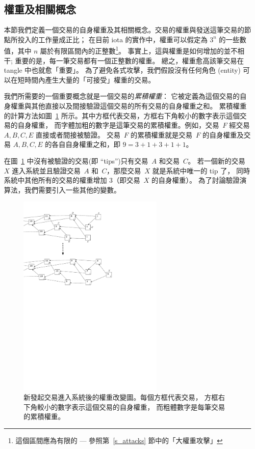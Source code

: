 \documentclass[12pt]{article}
\begin{document}
\begin{CJK}{UTF8}{bkai}
\section{權重及相關概念}
\label{s_weight_algo}
本節我們定義一個交易的自身權重及其相關概念。交易的權重與發送這筆交易的節點所投入的工作量成正比；
在目前 iota 的實作中，權重可以假定為 $3^n$ 的一些數值，其中 $n$ 屬於有限區間內的正整數\footnote{這個區間應為有限的 --- 
參照第~\ref{s_attacks} 節中的「大權重攻擊」}。
事實上，這與權重是如何增加的並不相干; 重要的是，每一筆交易都有一個正整數的權重。
總之，權重愈高該筆交易在 tangle 中也就愈「重要」。
為了避免各式攻擊，我們假設沒有任何角色 (entity) 可以在短時間內產生大量的「可接受」權重的交易。
 
我們所需要的一個重要概念就是一個交易的\emph{累積權重}：
它被定義為這個交易的自身權重與其他直接以及間接驗證這個交易的所有交易的自身權重之和。
累積權重的計算方法如圖~\ref{f_weights} 所示。其中方框代表交易，方框右下角較小的數字表示這個交易的自身權重，
而字體加粗的數字是這筆交易的累積權重。例如，交易~$F$ 經交易 $A,B,C,E$  直接或者間接被驗證。
交易~$F$ 的累積權重就是交易~$F$ 的自身權重及交易 $A,B,C,E$ 的各自自身權重之和，即 $9=3+1+3+1+1$。

在圖~\ref{f_weights} 中沒有被驗證的交易(即 “tips”)只有交易~$A$ 和交易~$C$。
若一個新的交易~$X$ 進入系統並且驗證交易~$A$ 和~$C$，那麼交易~$X$ 就是系統中唯一的 tip 了，
同時系統中其他所有的交易的權重增加 3（即交易~$X$ 的自身權重）。
為了討論驗證演算法，我們需要引入一些其他的變數。

\begin{figure}
 \centering \includegraphics[width=0.64\textwidth]{weights} 
\caption{新發起交易進入系統後的權重改變圖。每個方框代表交易，
方框右下角較小的數字表示這個交易的自身權重，
而粗體數字是每筆交易的累積權重。}
\label{f_weights}
\end{figure}


\end{CJK}
\end{document}
